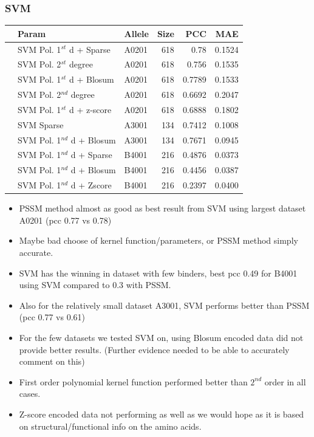 \documentclass[presentation]{beamer}   %
\begin{document}
 \frametitle{SVM}
\begin{frame}
\begin{table}[ht]\scriptsize
\begin{center}
\begin{tabular}{rllrrr}
  \hline
 & Param & Allele & Size & PCC & MAE \\ 
  \hline
 & SVM Pol. 1$^{st}$ d + Sparse & A0201 &   618 & 0.78 & 0.1524 \\ 
 & SVM Pol. 2$^{st}$ degree & A0201 &   618 & 0.756 & 0.1535 \\ 
 & SVM Pol. 1$^{st}$ d + Blosum & A0201 &   618 & 0.7789 & 0.1533 \\ 
 & SVM Pol. 2$^{nd}$ degree & A0201 &   618 & 0.6692 & 0.2047 \\ 
 & SVM Pol. 1$^{st}$ d + z-score & A0201 &   618 & 0.6888 & 0.1802 \\ 
 & SVM Sparse & A3001 &   134 & 0.7412 & 0.1008 \\ 
 & SVM Pol. 1$^{nd}$ d + Blosum & A3001 &   134 & 0.7671 & 0.0945 \\ 
 & SVM Pol. 1$^{nd}$ d + Sparse & B4001 &   216 & 0.4876 & 0.0373 \\ 
 & SVM Pol. 1$^{nd}$ d + Blosum & B4001 &   216 & 0.4456 & 0.0387 \\ 
 & SVM Pol. 1$^{nd}$ d + Zscore & B4001 &   216 & 0.2397 & 0.0400 \\ 
   \hline
\end{tabular}
\end{center}
\end{table}
\end{frame}

\begin{frame}
\begin{itemize}
\item<1> PSSM method almost as good as best result from SVM using largest dataset A0201 (pcc 0.77 vs 0.78)
\item<2> Maybe bad choose of kernel function/parameters, or PSSM method simply accurate.
\item<3> SVM has the winning in dataset with few binders, best pcc 0.49 for B4001 using SVM compared to 0.3 with PSSM.
\item<4> Also for the relatively small dataset A3001, SVM performs better than PSSM (pcc 0.77 vs 0.61)
\item<5> For the few datasets we tested SVM on, using Blosum encoded data did not provide better results. (Further evidence needed to be able to accurately comment on this)
\item<6> First order polynomial kernel function performed better than $2^{nd}$ order in all cases.
\item<7> Z-score encoded data not performing as well as we would hope as it is based on structural/functional info on the amino acids.
\end{itemize}
\end{frame}
\end{document}
